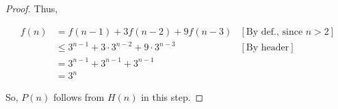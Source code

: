 \documentclass[12pt]{article}
\begin{document}
\begin{itemize}
\begin{proof}
        \bigskip

        Thus,

        \begin{align}
            f(n) &= f(n-1) + 3f(n-2) + 9f(n-3) & [\text{By def., since $n > 2$}]\\
            &\leq 3^{n-1} + 3 \cdot 3^{n-2} + 9 \cdot 3^{n-3} & [\text{By header}]\\
            &= 3^{n-1} + 3^{n-1} + 3^{n-1}\\
            &= 3^n
        \end{align}

        \bigskip

        So, $P(n)$ follows from $H(n)$ in this step.

    \end{proof}



















\end{itemize}
\end{document}
